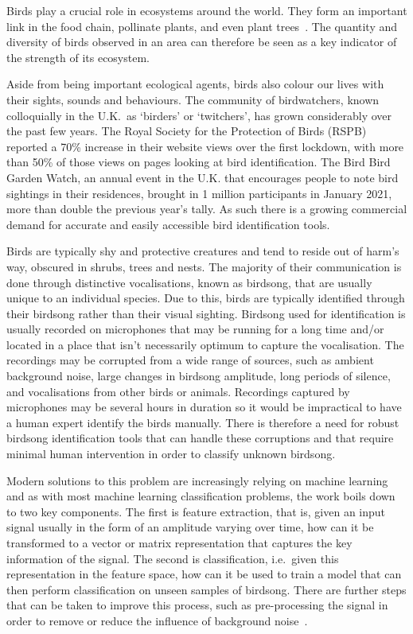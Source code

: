 Birds play a crucial role in ecosystems around the world. They form an important
link in the food chain, pollinate plants, and even plant
trees~\cite{broughton2021long}. The quantity and diversity of birds observed in
an area can therefore be seen as a key indicator of the strength of its
ecosystem.

Aside from being important ecological agents, birds also colour our lives with
their sights, sounds and behaviours. The community of birdwatchers, known
colloquially in the U.K.~as `birders' or `twitchers', has grown considerably
over the past few years. The Royal Society for the Protection of Birds (RSPB)
reported a 70\% increase in their website views over the first lockdown, with
more than 50\% of those views on pages looking at bird identification. The Bird
Bird Garden Watch, an annual event in the U.K. that encourages people to note
bird sightings in their residences, brought in 1 million participants in January
2021, more than double the previous year's tally. As such there is a growing
commercial demand for accurate and easily accessible bird identification tools.

Birds are typically shy and protective creatures and tend to reside out of
harm's way, obscured in shrubs, trees and nests. The majority of their
communication is done through distinctive vocalisations, known as birdsong, that
are usually unique to an individual species. Due to this, birds are typically
identified through their birdsong rather than their visual sighting. Birdsong
used for identification is usually recorded on microphones that may be running
for a long time and/or located in a place that isn't necessarily optimum to
capture the vocalisation. The recordings may be corrupted from a wide range of
sources, such as ambient background noise, large changes in birdsong amplitude,
long periods of silence, and vocalisations from other birds or animals.
Recordings captured by microphones may be several hours in duration so it would
be impractical to have a human expert identify the birds manually. There is
therefore a need for robust birdsong identification tools that can handle these
corruptions and that require minimal human intervention in order to classify
unknown birdsong. 

Modern solutions to this problem are increasingly relying on machine learning
and as with most machine learning classification problems, the work boils down
to two key components. The first is feature extraction, that is, given an input
signal usually in the form of an amplitude varying over time, how can it be
transformed to a vector or matrix representation that captures the key
information of the signal. The second is classification, i.e.~given this
representation in the feature space, how can it be used to train a model that
can then perform classification on unseen samples of birdsong. There are further
steps that can be taken to improve this process, such as pre-processing the
signal in order to remove or reduce the influence of background
noise~\cite{potamitis2014automatic}.

